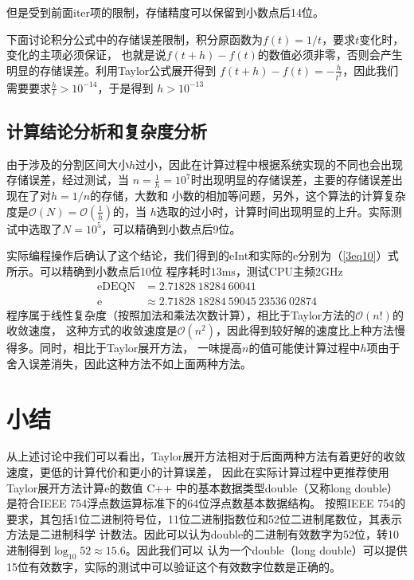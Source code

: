 \documentclass[onecolumn,compsoc]{IEEEtran}
\renewcommand{\|}{\Bigg |}
\newcommand{\e}{\mathrm{e}}
\begin{document}
但是受到前面iter项的限制，存储精度可以保留到小数点后14位。

下面讨论积分公式中的存储误差限制，积分原函数为$f(t) = 1/t$，要求$t$变化时，变化的主项必须保证，
也就是说$f(t+h) - f(t)$的数值必须非零，否则会产生明显的存储误差。利用Taylor公式展开得到
$f(t+h) - f(t) = -\frac{h}{t^2}$，因此我们需要要求$\frac{h}{t}>10^{-14}$，于是得到
$h > 10^{-13}$

\subsection{计算结论分析和复杂度分析}
由于涉及的分割区间大小$h$过小，因此在计算过程中根据系统实现的不同也会出现存储误差，经过测试，当
$n = \frac{1}{h} = 10^7$时出现明显的存储误差，主要的存储误差出现在了对$h = 1/n$的存储，大数和
小数的相加等问题，另外，这个算法的计算复杂度是$\mathcal O(N) = \mathcal O(\frac{1}{h})$的，当
$h$选取的过小时，计算时间出现明显的上升。实际测试中选取了$N = 10^5$，可以精确到小数点后9位。

实际编程操作后确认了这个结论，我们得到的eInt和实际的e分别为（\ref{3eq10}）式所示。可以精确到小数点后10位
程序耗时$13\mathrm{ms}$，测试CPU主频2GHz
\begin{equation}\label{3eq10}\begin{aligned}
\mathrm{eDEQN} &= 2.71828\ 18284\ 60041 \\ 
\e &\approx 2.71828\ 18284\ 59045\ 23536\ 02874 
\end{aligned}\end{equation}
程序属于线性复杂度（按照加法和乘法次数计算），相比于Taylor方法的$\mathcal{O}(n!)$的收敛速度，
这种方式的收敛速度是$\mathcal{O}(n^2)$，因此得到较好解的速度比上种方法慢得多。同时，相比于Taylor展开方法，
一味提高$n$的值可能使计算过程中$h$项由于舍入误差消失，因此这种方法不如上面两种方法。
\section{小结}
从上述讨论中我们可以看出，Taylor展开方法相对于后面两种方法有着更好的收敛速度，更低的计算代价和更小的计算误差，
因此在实际计算过程中更推荐使用Taylor展开方法计算e的数值
\appendix[C++ 标准中double的存储方式和有效值]
C++ 中的基本数据类型double（又称long double）是符合IEEE 754浮点数运算标准下的64位浮点数基本数据结构。
按照IEEE 754的要求，其包括1位二进制符号位，11位二进制指数位和52位二进制尾数位，其表示方法是二进制科学
计数法。因此可以认为double的二进制有效数字为52位，转10进制得到$\log_{10}52 \approx 15.6$。因此我们可以
认为一个double（long double）可以提供15位有效数字，实际的测试中可以验证这个有效数字位数是正确的。
\end{document}
